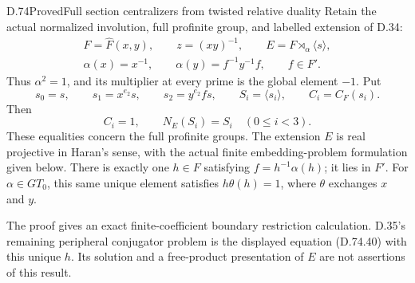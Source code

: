 \begin{claim}{D.74}{Proved}{Full section centralizers from twisted relative duality}
Retain the actual normalized involution, full profinite group,
and labelled extension of D.34:
\[
 \begin{gathered}
 F=\widehat F(x,y),\qquad z=(xy)^{-1},\qquad
 E=F\rtimes_\alpha\langle s\rangle,\\
 \alpha(x)=x^{-1},\qquad \alpha(y)=f^{-1}y^{-1}f,
 \qquad f\in F'.
 \end{gathered}
 \tag{D.74.1}
\]
Thus $\alpha^2=1$, and its multiplier at every prime is
the global element $-1$.  Put
\[
 s_0=s,\qquad s_1=x^{e_2}s,\qquad s_2=y^{e_2}fs,
 \qquad S_i=\langle s_i\rangle,\qquad C_i=C_F(s_i).
 \tag{D.74.2}
\]
Then
\[
                 C_i=1,\qquad N_E(S_i)=S_i
                       \quad(0\leq i<3).
 \tag{D.74.3}
\]
These equalities concern the full profinite groups.  The
extension $E$ is real projective in Haran's sense, with the
actual finite embedding-problem formulation given below.
There is exactly one $h\in F$ satisfying
$f=h^{-1}\alpha(h)$; it lies in $F'$.
For $\alpha\in GT_0$, this same unique element satisfies
$h\theta(h)=1$, where $\theta$ exchanges $x$ and $y$.

The proof gives an exact finite-coefficient boundary
restriction calculation.  D.35's remaining peripheral
conjugator problem is the displayed equation (D.74.40)
with this unique $h$.  Its solution and a free-product
presentation of $E$ are not assertions of this result.
\end{claim}
